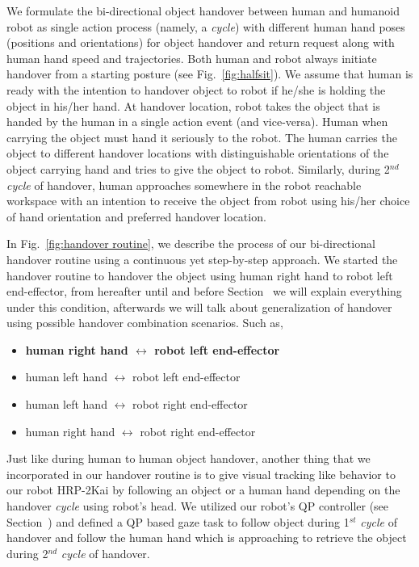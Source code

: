 We formulate the bi-directional object handover between human and humanoid robot as single action process (namely, a \textit{cycle}) with different human hand poses (positions and orientations) for object handover and return request along with human hand speed and trajectories. Both human and robot always initiate handover from a starting posture (see Fig.~\ref{fig:halfsit}). We assume that human is ready with the intention to handover object to robot if he/she is holding the object in his/her hand. At handover location, robot takes the object that is handed by the human in a single action event (and vice-versa). Human when carrying the object must hand it seriously to the robot. The human carries the object to different handover locations with distinguishable orientations of the object carrying hand and tries to give the object to robot. Similarly, during 2$^{nd}$ \textit{cycle} of handover, human approaches somewhere in the robot reachable workspace with an intention to receive the object from robot using his/her choice of hand orientation and preferred handover location. 


In Fig.~\ref{fig:handover routine}, we describe the process of our bi-directional handover routine using a continuous yet step-by-step approach. We started the handover routine to handover the object using human right hand to robot left end-effector, from hereafter until and before Section~ we will explain everything under this condition, afterwards we will talk about generalization of handover using possible handover combination scenarios. Such as,

\begin{itemize}
    \item \textbf{human right hand $\longleftrightarrow$ robot left end-effector}
    \item human left hand $\longleftrightarrow$ robot left end-effector 
    \item human left hand $\longleftrightarrow$  robot right end-effector
    \item human right hand $\longleftrightarrow$ robot right end-effector
\end{itemize}


Just like during human to human object handover, another thing that we incorporated in our handover routine is to give visual tracking like behavior to our robot HRP-2Kai by following an object or a human hand depending on the handover \textit{cycle} using robot's head. We utilized our robot's QP controller (see Section~) and defined a QP based gaze task to follow object during 1$^{st}$ \textit{cycle} of handover and follow the human hand which is approaching to retrieve the object during 2$^{nd}$ \textit{cycle} of handover.

